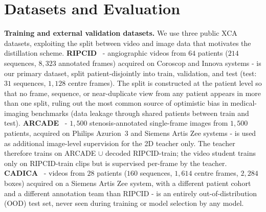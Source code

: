 \documentclass[conference]{IEEEtran}
\begin{document}
\section{Datasets and Evaluation}
\label{sec:datasets}

\textbf{Training and external validation datasets.} We use three public XCA datasets, exploiting the split between video and image data that motivates the distillation scheme. \textbf{RIPCID}~\cite{Danilov2021} - angiographic videos from $64$ patients ($214$ sequences, $8{,}323$ annotated frames) acquired on Coroscop and Innova systems - is our primary dataset, split patient-disjointly into train, validation, and test (test: $31$ sequences, $1{,}128$ centre frames). The split is constructed at the patient level so that no frame, sequence, or near-duplicate view from any patient appears in more than one split, ruling out the most common source of optimistic bias in medical-imaging benchmarks (data leakage through shared patients between train and test). \textbf{ARCADE}~\cite{popov2024arcade} - $1{,}500$ stenosis-annotated single-frame images from $1{,}500$ patients, acquired on Philips Azurion~3 and Siemens Artis Zee systems - is used as additional image-level supervision for the 2D teacher only. The teacher therefore trains on ARCADE $\cup$ decoded RIPCID-train; the video student trains only on RIPCID-train clips but is supervised per-frame by the teacher. \textbf{CADICA}~\cite{jimenezpartinen2024cadica} - videos from $28$ patients ($160$ sequences, $1{,}614$ centre frames, $2{,}284$ boxes) acquired on a Siemens Artis Zee system, with a different patient cohort and a different annotation team than RIPCID - is an entirely out-of-distribution (OOD) test set, never seen during training or model selection by any model.
\end{document}
